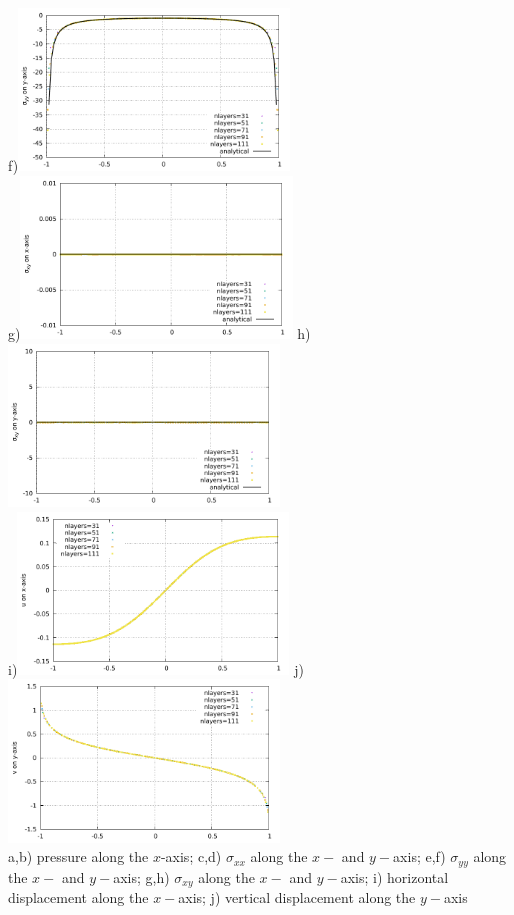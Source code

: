 \begin{center}
f)\includegraphics[width=7.2cm]{python_codes/fieldstone_58/results/sigmayy_yaxis.pdf}\\
g)\includegraphics[width=7.2cm]{python_codes/fieldstone_58/results/sigmaxy_xaxis.pdf}
h)\includegraphics[width=7.2cm]{python_codes/fieldstone_58/results/sigmaxy_yaxis.pdf}\\
i)\includegraphics[width=7.2cm]{python_codes/fieldstone_58/results/u_xaxis.pdf}
j)\includegraphics[width=7.2cm]{python_codes/fieldstone_58/results/v_yaxis.pdf}\\
{\captionfont a,b) pressure along the $x$-axis;
c,d) $\sigma_{xx}$  along the $x-$ and $y-$axis; 
e,f) $\sigma_{yy}$  along the $x-$ and $y-$axis; 
g,h) $\sigma_{xy}$  along the $x-$ and $y-$axis; 
i) horizontal displacement along the $x-$axis; 
j) vertical displacement along the $y-$axis}
\end{center}


